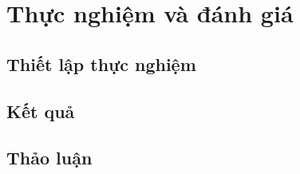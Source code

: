 \chapter{Thực nghiệm và đánh giá}
\label{chap:evaluation}

\section{Thiết lập thực nghiệm}

\section{Kết quả}

\section{Thảo luận}
